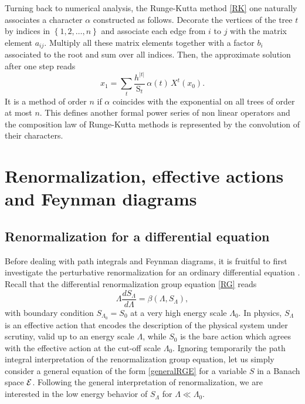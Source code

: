 \documentclass[12pt,here,feynmf]{article}
\begin{document}
Turning back to numerical analysis, the Runge-Kutta method \eqref{RK} one naturally associates a  character $\alpha$ constructed as follows. 
Decorate the vertices of the tree $t$ by indices in $\left\{1,2,\dots,n\right\}$ and associate each edge from $i$ to $j$ with the matrix element $a_{ij}$. Multiply all these matrix elements together with a factor $b_{i}$ associated to the root and sum over all indices. Then, the approximate solution after one step reads 
\begin{equation}
x_{1}=\sum_{t}\frac{h^{|t|}}{{\mathrm S}_{t}}\,\alpha(t)\,X^{t}(x_{0}).
\end{equation}
It is a method of order $n$ if $\alpha$ coincides with the exponential on all trees of order at most $n$. This defines another formal power series of non linear operators and the composition law of Runge-Kutta methods is represented by the convolution of their characters.

\label{difftime}


\section{Renormalization, effective actions and Feynman diagrams}

\subsection{Renormalization for a differential equation}

\label{diffren}

Before dealing with path integrals and Feynman diagrams, it is fruitful to first investigate the perturbative renormalization for an ordinary differential equation \cite{GKM}. Recall that the differential renormalization group equation \eqref{RG} reads
\begin{equation}
\Lambda\frac{d
S_{\Lambda}}{d\Lambda}=\beta(\Lambda,S_\Lambda),\label{generalRGE}
\end{equation}
with boundary condition $S_{\Lambda_{0}}=S_{0}$ at a very high energy scale $\Lambda_{0}$.  In physics, $S_{\Lambda}$  is an effective  action that encodes the description of the physical system under scrutiny, valid up to an energy scale $\Lambda$, while  $S_{0}$ is the bare action which agrees with the effective action at the cut-off scale $\Lambda_{0}$. Ignoring temporarily the path integral interpretation of the renormalization group equation, let us simply consider a general equation of the form \eqref{generalRGE} for a variable $S$ in a Banach space ${\cal E}$. Following the general interpretation of renormalization, we are interested in the low energy behavior of $S_{\Lambda}$ for $\Lambda\ll \Lambda_{0}$. 
\end{document}
